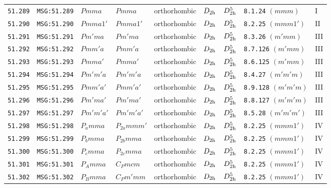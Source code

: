 \documentclass[fleqn,10pt]{jsarticle}
\begin{document}
\begin{center}
\begin{longtable}{lllllllll}
\texttt{51.289} & \texttt{MSG:51.289} & $Pmma$ & $Pmma$ & orthorhombic & $D_{\rm 2h}$ & $D_{\rm 2h}^{5}$ & \texttt{8.1.24} $(mmm)$ & I \\
\texttt{51.290} & \texttt{MSG:51.290} & $Pmma1'$ & $Pmma1'$ & orthorhombic & $D_{\rm 2h}$ & $D_{\rm 2h}^{5}$ & \texttt{8.2.25} $(mmm1')$ & II \\
\texttt{51.291} & \texttt{MSG:51.291} & $Pm'ma$ & $Pm'ma$ & orthorhombic & $D_{\rm 2h}$ & $D_{\rm 2h}^{5}$ & \texttt{8.3.26} $(m'mm)$ & III \\
\texttt{51.292} & \texttt{MSG:51.292} & $Pmm'a$ & $Pmm'a$ & orthorhombic & $D_{\rm 2h}$ & $D_{\rm 2h}^{5}$ & \texttt{8.7.126} $(m'mm)$ & III \\
\texttt{51.293} & \texttt{MSG:51.293} & $Pmma'$ & $Pmma'$ & orthorhombic & $D_{\rm 2h}$ & $D_{\rm 2h}^{5}$ & \texttt{8.6.125} $(m'mm)$ & III \\
\texttt{51.294} & \texttt{MSG:51.294} & $Pm'm'a$ & $Pm'm'a$ & orthorhombic & $D_{\rm 2h}$ & $D_{\rm 2h}^{5}$ & \texttt{8.4.27} $(m'm'm)$ & III \\
\texttt{51.295} & \texttt{MSG:51.295} & $Pmm'a'$ & $Pmm'a'$ & orthorhombic & $D_{\rm 2h}$ & $D_{\rm 2h}^{5}$ & \texttt{8.9.128} $(m'm'm)$ & III \\
\texttt{51.296} & \texttt{MSG:51.296} & $Pm'ma'$ & $Pm'ma'$ & orthorhombic & $D_{\rm 2h}$ & $D_{\rm 2h}^{5}$ & \texttt{8.8.127} $(m'm'm)$ & III \\
\texttt{51.297} & \texttt{MSG:51.297} & $Pm'm'a'$ & $Pm'm'a'$ & orthorhombic & $D_{\rm 2h}$ & $D_{\rm 2h}^{5}$ & \texttt{8.5.28} $(m'm'm')$ & III \\
\texttt{51.298} & \texttt{MSG:51.298} & $P_{a}mma$ & $P_{2a}mmm'$ & orthorhombic & $D_{\rm 2h}$ & $D_{\rm 2h}^{5}$ & \texttt{8.2.25} $(mmm1')$ & IV \\
\texttt{51.299} & \texttt{MSG:51.299} & $P_{b}mma$ & $P_{2b}mma$ & orthorhombic & $D_{\rm 2h}$ & $D_{\rm 2h}^{5}$ & \texttt{8.2.25} $(mmm1')$ & IV \\
\texttt{51.300} & \texttt{MSG:51.300} & $P_{c}mma$ & $P_{2c}mma$ & orthorhombic & $D_{\rm 2h}$ & $D_{\rm 2h}^{5}$ & \texttt{8.2.25} $(mmm1')$ & IV \\
\texttt{51.301} & \texttt{MSG:51.301} & $P_{A}mma$ & $C_{P}mcm$ & orthorhombic & $D_{\rm 2h}$ & $D_{\rm 2h}^{5}$ & \texttt{8.2.25} $(mmm1')$ & IV \\
\texttt{51.302} & \texttt{MSG:51.302} & $P_{B}mma$ & $C_{P}m'mm$ & orthorhombic & $D_{\rm 2h}$ & $D_{\rm 2h}^{5}$ & \texttt{8.2.25} $(mmm1')$ & IV \\

\end{longtable}
\end{center}
\end{document}
